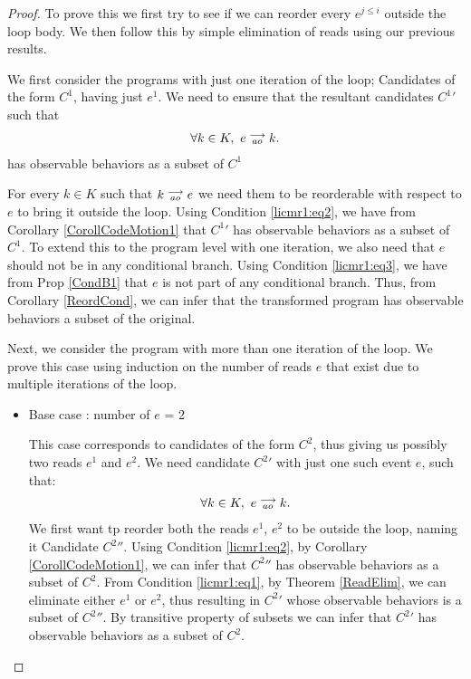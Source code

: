 \begin{proof}

    To prove this we first try to see if we can reorder every $e^{j\leq i}$ outside the loop body.
    We then follow this by simple elimination of reads using our previous results. 

    We first consider the programs with just one iteration of the loop; Candidates of the form $C^1$, having just $e^1$. 
    We need to ensure that the resultant candidates $C^{1}'$ such that 
    \begin{align*}
        \forall k \in K, \ e\stackrel{\longrightarrow}{_{ao}}k.
    \end{align*}  
    has observable behaviors as a subset of $C^1$

    For every $k \in K$ such that $k\stackrel{\longrightarrow}{_{ao}}e$ we need them to be reorderable with respect to $e$ to bring it outside the loop.
    Using Condition \ref{licmr1:eq2}, we have from Corollary \ref{CorollCodeMotion1} that $C^{1}'$ has observable behaviors as a subset of $C^1$.
    To extend this to the program level with one iteration, we also need that $e$ should not be in any conditional branch.
    Using Condition \ref{licmr1:eq3}, we have from Prop \ref{CondB1} that $e$ is not part of any conditional branch.
    Thus, from Corollary \ref{ReordCond}, we can infer that the transformed program has observable behaviors a subset of the original.  
    
    Next, we consider the program with more than one iteration of the loop. 
    We prove this case using induction on the number of reads $e$ that exist due to multiple iterations of the loop. 
    \begin{itemize}

        \item Base case : number of $e$ = 2
    
        This case corresponds to candidates of the form $C^2$, thus giving us possibly two reads $e^1$ and $e^2$.
        We need candidate $C^2'$ with just one such event $e$, such that:
        \begin{align*}
            \forall k \in K, \ e\stackrel{\longrightarrow}{_{ao}}k.
        \end{align*}
        We first want tp reorder both the reads $e^1$, $e^2$ to be outside the loop, naming it Candidate $C^{2}''$.
        Using Condition \ref{licmr1:eq2}, by Corollary \ref{CorollCodeMotion1}, we can infer that $C^{2}''$ has observable behaviors as a subset of $C^2$. 
        From Condition \ref{licmr1:eq1}, by Theorem \ref{ReadElim}, we can eliminate either $e^1$ or $e^2$, thus resulting in $C^2'$ whose observable behaviors is a subset of $C^{2}''$.
        By transitive property of subsets we can infer that $C^2'$ has observable behaviors as a subset of $C^2$.
        

\end{itemize}
\end{proof}
